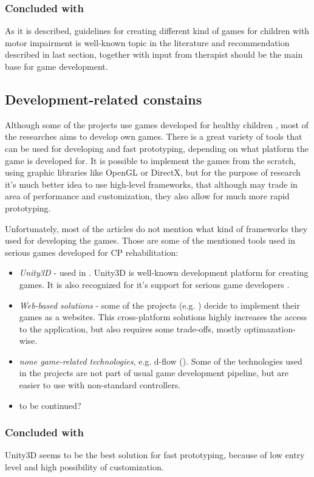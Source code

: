 \subsubsection{Concluded with}
As it is described, guidelines for creating different kind of games for children with motor impairment is well-known topic in the literature and recommendation described in last section, together with input from therapist should be the main base for game development. 

\subsection{Development-related constains}
Although some of the projects use games developed for healthy children \cite{game_xbox_360}, most of the researches aims to develop own games. There is a great variety of tools that can be used for developing and fast prototyping, depending on what platform the game is developed for. It is possible to implement the games from the scratch, using graphic libraries like OpenGL or DirectX, but for the purpose of research it's much better idea to use high-level frameworks, that although may trade in area of performance and customization, they also allow for much more rapid prototyping. 

Unfortunately, most of the articles do not mention what kind of frameworks they used for developing the games. Those are some of the mentioned tools used in serious games developed for CP rehabilitation:
\begin{itemize}
\item \emph{Unity3D \cite{unity}} - used in \cite{action}. Unity3D is well-known development platform for creating games. It is also recognized for it's support for serious game developers \cite{award}.
\item \emph{Web-based solutions} - some of the projects (e.g. \cite{inverse}) decide to implement their games as a websites. This cross-platform solutions highly increases the access to the application, but also requires some trade-offs, mostly optimazation-wise. 
\item \emph{none game-related technologies}, e.g. d-flow (\cite{bimanual}). Some of the technologies used in the projects are not part of usual game development pipeline, but are easier to use with non-standard controllers. 
\item to be continued?
\end{itemize}
\subsubsection{Concluded with}
Unity3D seems to be the best solution for fast prototyping, because of low entry level and high possibility of customization. 

